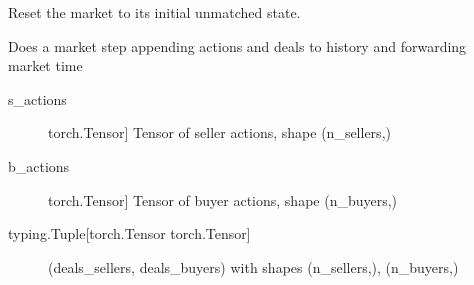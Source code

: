 \documentclass[letterpaper,10pt,english]{sphinxmanual}
\begin{document}
\begin{fulllineitems}

\begin{fulllineitems}
\label{\detokenize{MultiAgentMarketRL:markets.MarketMatchHiLo.reset}}
\sphinxAtStartPar
Reset the market to its initial unmatched state.

\end{fulllineitems}


\begin{fulllineitems}
\label{\detokenize{MultiAgentMarketRL:markets.MarketMatchHiLo.step}}
\sphinxAtStartPar
Does a market step appending actions and deals to history and forwarding market time
\begin{description}
\item[{s\_actions}] \leavevmode{[}torch.Tensor{]}
\sphinxAtStartPar
Tensor of seller actions, shape (n\_sellers,)

\item[{b\_actions}] \leavevmode{[}torch.Tensor{]}
\sphinxAtStartPar
Tensor of buyer actions, shape (n\_buyers,)

\end{description}
\begin{description}
\item[{typing.Tuple{[}torch.Tensor torch.Tensor{]}}] \leavevmode
\sphinxAtStartPar
(deals\_sellers, deals\_buyers) with shapes (n\_sellers,), (n\_buyers,)

\end{description}

\end{fulllineitems}


\end{fulllineitems}

\label{\detokenize{MultiAgentMarketRL:module-trainer}}
\end{document}

